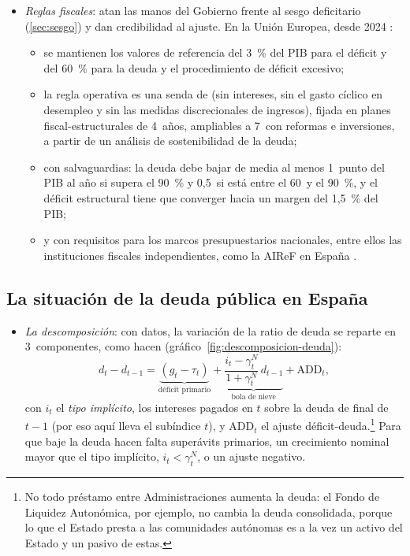\documentclass[11pt]{article}
\begin{document}
\begin{itemize}
\item \emph{Reglas fiscales}: atan las manos del Gobierno frente al sesgo deficitario (\ref{sec:sesgo}) y dan credibilidad al ajuste. En la Unión Europea, desde 2024 :
  \begin{itemize}
  \item se mantienen los valores de referencia del 3~\% del PIB para el déficit y del 60~\% para la deuda y el procedimiento de déficit excesivo\nocite{TFUE2012Protocolo12,UE2024Reglamento1264};
  \item la regla operativa es una senda de  (sin intereses, sin el gasto cíclico en desempleo y sin las medidas discrecionales de ingresos), fijada en planes fiscal-estructurales de 4~años, ampliables a 7~con reformas e inversiones, a partir de un análisis de sostenibilidad de la deuda\nocite{UE2024Reglamento1263};
  \item con salvaguardias: la deuda debe bajar de media al menos 1~punto del PIB al año si supera el 90~\% y 0,5~si está entre el 60~y el 90~\%, y el déficit estructural tiene que converger hacia un margen del 1,5~\% del PIB\nocite{UE2024Reglamento1263};
  \item y con requisitos para los marcos presupuestarios nacionales, entre ellos las instituciones fiscales independientes, como la AIReF en España\nocite{DirUE2024Marcos} .
  \end{itemize}
\end{itemize}

\subsection{La situación de la deuda pública en España}\label{sec:espana}

\begin{itemize}
\item \emph{La descomposición}: con datos, la variación de la ratio de deuda se reparte en 3~componentes, como hacen \textcite{EstevePrats2023Cambios} (gráfico~\ref{fig:descomposicion-deuda}):
  \begin{equation}\label{eq:descomposicion-deuda}
  d_t-d_{t-1}=\underbrace{(g_t-\tau_t)}_{\text{déficit primario}}+\underbrace{\frac{i_t-\gamma^N_t}{1+\gamma^N_t}\,d_{t-1}}_{\text{bola de nieve}}+\mathrm{ADD}_t ,
  \end{equation}
  con $i_t$ el \emph{tipo implícito}, los intereses pagados en $t$ sobre la deuda de final de $t-1$ (por eso aquí lleva el subíndice $t$), y $\mathrm{ADD}_t$ el ajuste déficit-deuda.\footnote{No todo préstamo entre Administraciones aumenta la deuda: el Fondo de Liquidez Autonómica, por ejemplo, no cambia la deuda consolidada, porque lo que el Estado presta a las comunidades autónomas es a la vez un activo del Estado y un pasivo de estas.} Para que baje la deuda hacen falta superávits primarios, un crecimiento nominal mayor que el tipo implícito, $i_t<\gamma^N_t$, o un ajuste negativo.
\end{itemize}
\end{document}
